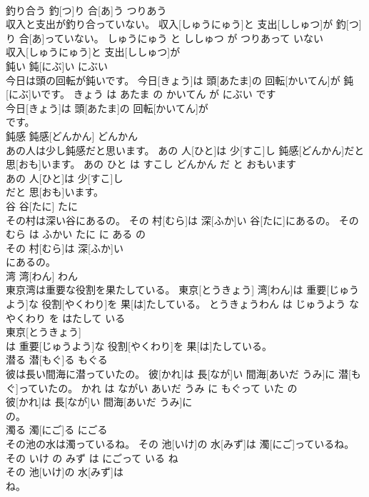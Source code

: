 \documentclass[8pt]{extreport}
\begin{document}
\begin{CJK}{UTF8}{min}
\\	釣り合う	釣[つ]り 合[あ]う	つりあう	
\\	収入と支出が釣り合っていない。	収入[しゅうにゅう]と 支出[ししゅつ]が 釣[つ]り 合[あ]っていない。	しゅうにゅう と ししゅつ が つりあって いない	
\\	収入[しゅうにゅう]と 支出[ししゅつ]が
\\	鈍い	鈍[にぶ]い	にぶい	
\\	今日は頭の回転が鈍いです。	今日[きょう]は 頭[あたま]の 回転[かいてん]が 鈍[にぶ]いです。	きょう は あたま の かいてん が にぶい です	
\\	今日[きょう]は 頭[あたま]の 回転[かいてん]が
\\	です。			
\\	鈍感	鈍感[どんかん]	どんかん	
\\	あの人は少し鈍感だと思います。	あの 人[ひと]は 少[すこ]し 鈍感[どんかん]だと 思[おも]います。	あの ひと は すこし どんかん だ と おもいます	
\\	あの 人[ひと]は 少[すこ]し
\\	だと 思[おも]います。			
\\	谷	谷[たに]	たに	
\\	その村は深い谷にあるの。	その 村[むら]は 深[ふか]い 谷[たに]にあるの。	その むら は ふかい たに に ある の	
\\	その 村[むら]は 深[ふか]い
\\	にあるの。			
\\	湾	湾[わん]	わん	
\\	東京湾は重要な役割を果たしている。	東京[とうきょう] 湾[わん]は 重要[じゅうよう]な 役割[やくわり]を 果[は]たしている。	とうきょうわん は じゅうよう な やくわり を はたして いる	
\\	東京[とうきょう]
\\	は 重要[じゅうよう]な 役割[やくわり]を 果[は]たしている。			
\\	潜る	潜[もぐ]る	もぐる	
\\	彼は長い間海に潜っていたの。	彼[かれ]は 長[なが]い 間海[あいだ うみ]に 潜[もぐ]っていたの。	かれ は ながい あいだ うみ に もぐって いた の	
\\	彼[かれ]は 長[なが]い 間海[あいだ うみ]に
\\	の。			
\\	濁る	濁[にご]る	にごる	
\\	その池の水は濁っているね。	その 池[いけ]の 水[みず]は 濁[にご]っているね。	その いけ の みず は にごって いる ね	
\\	その 池[いけ]の 水[みず]は
\\	ね。			

\end{CJK}
\end{document}
